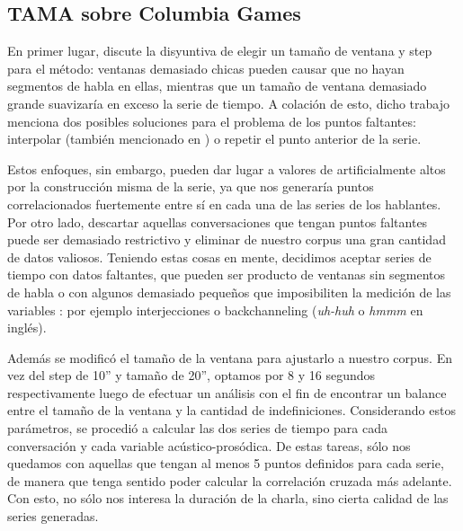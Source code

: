 \subsection{TAMA sobre Columbia Games}
\label{sec:tama_modifications}

En primer lugar, \cite{KOU2008.2} discute la disyuntiva de elegir un tamaño de ventana y step para el método: ventanas demasiado chicas pueden causar que no hayan segmentos de habla en ellas, mientras que un tamaño de ventana demasiado grande suavizaría en exceso la serie de tiempo. A colación de esto, dicho trabajo menciona dos posibles soluciones para el problema de los puntos faltantes: interpolar (también mencionado en \cite{DEL2013}) o repetir el punto anterior de la serie.

Estos enfoques, sin embargo, pueden dar lugar a valores de \entrainment artificialmente altos por la construcción misma de la serie, ya que nos generaría puntos correlacionados fuertemente entre sí en cada una de las series de los hablantes. Por otro lado, descartar aquellas conversaciones que tengan puntos faltantes puede ser demasiado restrictivo y eliminar de nuestro corpus una gran cantidad de datos valiosos. Teniendo estas cosas en mente, decidimos aceptar series de tiempo con datos faltantes, que pueden ser producto de ventanas sin segmentos de habla o con algunos demasiado pequeños que imposibiliten la medición de las variables \ap: por ejemplo interjecciones o backchanneling (\emph{uh-huh} o \emph{hmmm} en inglés).

Además se modificó el tamaño de la ventana para ajustarlo a nuestro corpus. En vez del step de 10'' y tamaño de 20'', optamos por 8 y 16 segundos respectivamente luego de efectuar un análisis con el fin de encontrar un balance entre el tamaño de la ventana y la cantidad de indefiniciones. Considerando estos parámetros, se procedió a calcular las dos series de tiempo para cada conversación y cada variable acústico-prosódica. De estas tareas, sólo nos quedamos con aquellas que tengan al menos 5 puntos definidos para cada serie, de manera que tenga sentido poder calcular la correlación cruzada más adelante. Con esto, no sólo nos interesa la duración de la charla, sino cierta calidad de las series generadas.
